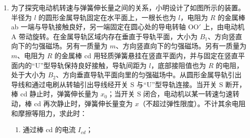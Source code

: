 \documentclass[\gkver]{gaokaozhenti}
\begin{document}
\begin{enumerate}
\begin{enumerate}
	（B）测量原、副线圈的电压，可用“测定电池的电动势和内阻”实验中的直流电压表

	（C）原线圈接 0、8 接线柱，副线圈接 0、4 接线柱，副线圈电压大于原线圈电压

	（D）为便于探究，先保持原线圈匝数和电压不变，改变副线圈的匝数，研究其对副线圈电压的影响

\end{enumerate}

\item
为了探究电动机转速与弹簧伸长量之间的关系，小明设计了如图所示的装置。半径为 $l$ 的圆形金属导轨固定在水平面上，一根长也为 $l$，电阻为 $R$ 的金属棒 ab 一端与导轨接触良好，另一端固定在圆心处的导电转轴 OO$'$ 上，由电动机 A 带动旋转。在金属导轨区域内存在垂直于导轨平面，大小为 $B_{1}$、方向竖直向下的匀强磁场。另有一质量为 $m$、方向竖直向下的匀强磁场。另有一质量为 $m$、电阻为 $R$ 的金属棒 cd 用轻质弹簧悬挂在竖直平面内，并与固定在竖直平面内的“U”型导轨保持良好接触，导轨间距为 $l$，底部接阻值也为 $R$ 的电阻，处于大小为 $B_{2}$、方向垂直导轨平面向里的匀强磁场中。从圆形金属导轨引出导线和通过电刷从转轴引出导线经开关 S 与“U”型导轨连接。当开关 S 断开，棒 cd 静止时，弹簧伸长量为 $x_{0}$；当开关 S 闭合，电动机以某一转速匀速转动，棒 cd 再次静止时，弹簧伸长量变为 $x$（不超过弹性限度）。不计其余电阻和摩擦等阻力，求此时：
\begin{enumerate}
	\item
	通过棒 cd 的电流 $I_{cd}$；


\end{enumerate}
\end{enumerate}
\end{document}
